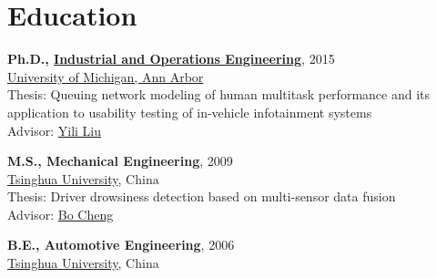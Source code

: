 \documentclass[11pt]{article}
\newenvironment{main}
{\begin{adjustwidth}{3em}{}}
{\end{adjustwidth}}
\begin{document}
\section*{Education}
\begin{main}

\textbf{Ph.D., \href{https://ioe.engin.umich.edu/}{Industrial and Operations Engineering}}, 2015\\
\href{https://umich.edu/}{University of Michigan, Ann Arbor}\\
Thesis: Queuing network modeling of human multitask performance and its application to usability testing of in-vehicle infotainment systems\\
Advisor: \href{http://www-personal.umich.edu/~yililiu/}{Yili Liu}

\textbf{M.S., Mechanical Engineering}, 2009\\
\href{https://www.tsinghua.edu.cn/publish/thu2018en/index.html}{Tsinghua University}, China\\
Thesis: Driver drowsiness detection based on multi-sensor data fusion\\
Advisor: \href{https://www.tsinghua.edu.cn/publish/daeen/4370/2011/20110420161543357940142/20110420161543357940142_.html}{Bo Cheng}

\textbf{B.E., Automotive Engineering}, 2006\\
\href{https://www.tsinghua.edu.cn/publish/thu2018en/index.html}{Tsinghua University}, China


\end{main}
\end{document}
